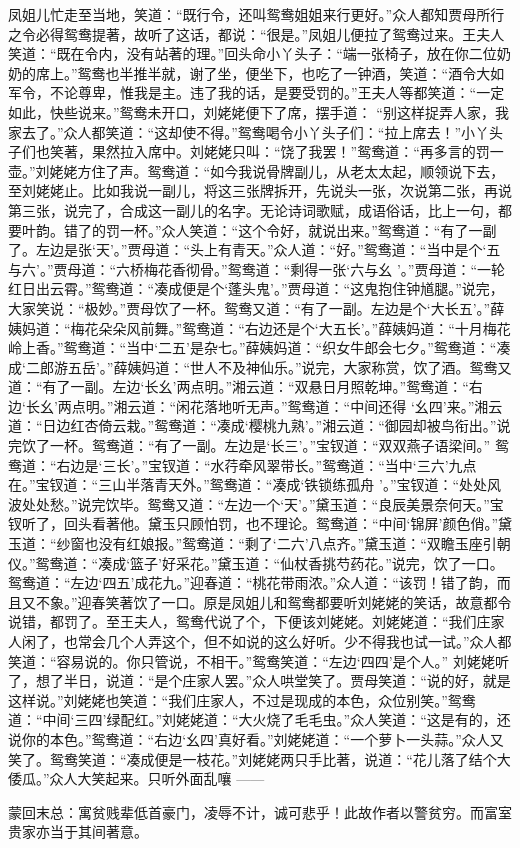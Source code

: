 \begin{parag}
    凤姐儿忙走至当地，笑道：“既行令，还叫鸳鸯姐姐来行更好。”众人都知贾母所行之令必得鸳鸯提著，故听了这话，都说：“很是。”凤姐儿便拉了鸳鸯过来。王夫人笑道：“既在令内，没有站著的理。”回头命小丫头子：“端一张椅子，放在你二位奶奶的席上。”鸳鸯也半推半就，谢了坐，便坐下，也吃了一钟酒，笑道：“酒令大如军令，不论尊卑，惟我是主。违了我的话，是要受罚的。”王夫人等都笑道：“一定如此，快些说来。”鸳鸯未开口，刘姥姥便下了席，摆手道： “别这样捉弄人家，我家去了。”众人都笑道：“这却使不得。”鸳鸯喝令小丫头子们：“拉上席去！”小丫头子们也笑著，果然拉入席中。刘姥姥只叫：“饶了我罢！”鸳鸯道：“再多言的罚一壶。”刘姥姥方住了声。鸳鸯道：“如今我说骨牌副儿，从老太太起，顺领说下去，至刘姥姥止。比如我说一副儿，将这三张牌拆开，先说头一张，次说第二张，再说第三张，说完了，合成这一副儿的名字。无论诗词歌赋，成语俗话，比上一句，都要叶韵。错了的罚一杯。”众人笑道：“这个令好，就说出来。”鸳鸯道：“有了一副了。左边是张‘天’。”贾母道：“头上有青天。”众人道：“好。”鸳鸯道：“当中是个‘五与六’。”贾母道：“六桥梅花香彻骨。”鸳鸯道：“剩得一张‘六与幺 ’。”贾母道：“一轮红日出云霄。”鸳鸯道：“凑成便是个‘蓬头鬼’。”贾母道：“这鬼抱住钟馗腿。”说完，大家笑说：“极妙。”贾母饮了一杯。鸳鸯又道：“有了一副。左边是个‘大长五’。”薛姨妈道：“梅花朵朵风前舞。”鸳鸯道：“右边还是个‘大五长’。”薛姨妈道：“十月梅花岭上香。”鸳鸯道：“当中‘二五’是杂七。”薛姨妈道：“织女牛郎会七夕。”鸳鸯道：“凑成‘二郎游五岳’。”薛姨妈道：“世人不及神仙乐。”说完，大家称赏，饮了酒。鸳鸯又道：“有了一副。左边‘长幺’两点明。”湘云道：“双悬日月照乾坤。”鸳鸯道：“右边‘长幺’两点明。”湘云道：“闲花落地听无声。”鸳鸯道：“中间还得 ‘幺四’来。”湘云道：“日边红杏倚云栽。”鸳鸯道：“凑成‘樱桃九熟’。”湘云道：“御园却被鸟衔出。”说完饮了一杯。鸳鸯道：“有了一副。左边是‘长三’。”宝钗道：“双双燕子语梁间。” 鸳鸯道：“右边是‘三长’。”宝钗道：“水荇牵风翠带长。”鸳鸯道：“当中‘三六’九点在。”宝钗道：“三山半落青天外。”鸳鸯道：“凑成‘铁锁练孤舟 ’。”宝钗道：“处处风波处处愁。”说完饮毕。鸳鸯又道：“左边一个‘天’。”黛玉道：“良辰美景奈何天。”宝钗听了，回头看著他。黛玉只顾怕罚，也不理论。鸳鸯道：“中间‘锦屏’颜色俏。”黛玉道：“纱窗也没有红娘报。”鸳鸯道：“剩了‘二六’八点齐。”黛玉道：“双瞻玉座引朝仪。”鸳鸯道：“凑成‘篮子’好采花。”黛玉道：“仙杖香挑芍药花。”说完，饮了一口。鸳鸯道：“左边‘四五’成花九。”迎春道：“桃花带雨浓。”众人道：“该罚！错了韵，而且又不象。”迎春笑著饮了一口。原是凤姐儿和鸳鸯都要听刘姥姥的笑话，故意都令说错，都罚了。至王夫人，鸳鸯代说了个，下便该刘姥姥。刘姥姥道：“我们庄家人闲了，也常会几个人弄这个，但不如说的这么好听。少不得我也试一试。”众人都笑道：“容易说的。你只管说，不相干。”鸳鸯笑道：“左边‘四四’是个人。” 刘姥姥听了，想了半日，说道：“是个庄家人罢。”众人哄堂笑了。贾母笑道：“说的好，就是这样说。”刘姥姥也笑道：“我们庄家人，不过是现成的本色，众位别笑。”鸳鸯道：“中间‘三四’绿配红。”刘姥姥道：“大火烧了毛毛虫。”众人笑道：“这是有的，还说你的本色。”鸳鸯道：“右边‘幺四’真好看。”刘姥姥道：“一个萝卜一头蒜。”众人又笑了。鸳鸯笑道：“凑成便是一枝花。”刘姥姥两只手比著，说道：“花儿落了结个大倭瓜。”众人大笑起来。只听外面乱嚷 ——
\end{parag}


\begin{parag}
    \begin{note}蒙回末总：寓贫贱辈低首豪门，凌辱不计，诚可悲乎！此故作者以警贫穷。而富室贵家亦当于其间著意。\end{note}
\end{parag}

